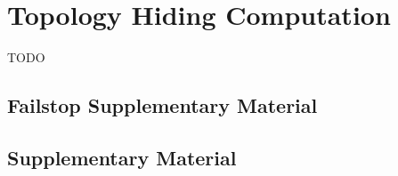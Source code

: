 \chapter{Topology Hiding Computation}
TODO











\section*{Failstop Supplementary Material}










\section*{Supplementary Material}





